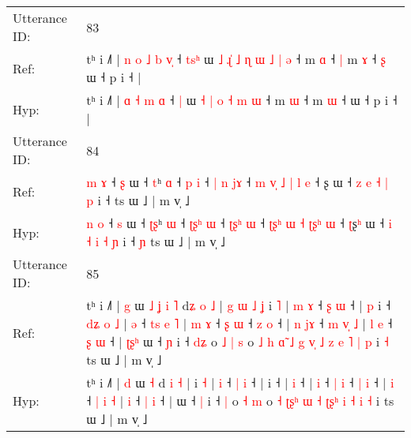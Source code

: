 \documentclass[10pt]{article}
\DeclareRobustCommand{\hl}[1]{{\textcolor{red}{#1}}}
\begin{document}
\begin{longtable}{ll}
 \\
\midrule
Utterance ID: & 83 \\
Ref: & tʰ i ˩˥ |\hl{ }\hl{n} \hl{o} \hl{˩} \hl{b} \hl{v}\hl{̩} ˧ \hl{t}\hl{s}\hl{ʰ} ɯ\hl{ }\hl{˩}\hl{ }\hl{ɻ}\hl{̍} \hl{˩} \hl{ɳ} \hl{ɯ} \hl{˩} \hl{|} \hl{ə} ˧ m \hl{ɑ} ˧\hl{ }\hl{|} m \hl{ɤ} ˧\hl{ }\hl{ʂ} ɯ ˧ p i ˧ |
 \\
Hyp: & tʰ i ˩˥ |\hl{}\hl{} \hl{ɑ} \hl{˧} \hl{m} \hl{}\hl{ɑ} ˧ \hl{}\hl{}\hl{|} ɯ\hl{}\hl{}\hl{}\hl{}\hl{} \hl{˧} \hl{|} \hl{o} \hl{˧} \hl{m} \hl{ɯ} ˧ m \hl{ɯ} ˧\hl{}\hl{} m \hl{ɯ} ˧\hl{}\hl{} ɯ ˧ p i ˧ |
 \\
\midrule
Utterance ID: & 84 \\
Ref: & \hl{m} \hl{ɤ} ˧ \hl{ʂ} ɯ ˧ \hl{}\hl{t}ʰ \hl{ɑ} ˧ \hl{}\hl{}\hl{p} \hl{i} ˧ \hl{|}\hl{ }\hl{n} \hl{j}\hl{ɤ} ˧ \hl{}\hl{m}\hl{ }\hl{v}\hl{̩} \hl{˩} \hl{|}\hl{ }\hl{l} \hl{e} ˧ \hl{}ʂ\hl{} ɯ ˧ \hl{z} \hl{e} \hl{˧} \hl{|} \hl{p} i ˧\hl{}\hl{} ts ɯ ˩ | m v̩ ˩
 \\
Hyp: & \hl{n} \hl{o} ˧ \hl{s} ɯ ˧ \hl{ʈ}\hl{ʂ}ʰ \hl{ɯ} ˧ \hl{ʈ}\hl{ʂ}\hl{ʰ} \hl{ɯ} ˧ \hl{ʈ}\hl{ʂ}\hl{ʰ} \hl{}\hl{ɯ} ˧ \hl{ʈ}\hl{ʂ}\hl{ʰ}\hl{ }\hl{ɯ} \hl{˧} \hl{ʈ}\hl{ʂ}\hl{ʰ} \hl{ɯ} ˧ \hl{ʈ}ʂ\hl{ʰ} ɯ ˧ \hl{i} \hl{˧} \hl{i} \hl{˧} \hl{ɲ} i ˧\hl{ }\hl{ɲ} ts ɯ ˩ | m v̩ ˩
 \\
\midrule
Utterance ID: & 85 \\
Ref: & tʰ i ˩˥ | \hl{g} ɯ\hl{ }\hl{˩}\hl{ }\hl{ʝ}\hl{ }\hl{i} \hl{˥} d\hl{ʑ} \hl{o} \hl{˩} |\hl{ }\hl{g}\hl{ }\hl{ɯ}\hl{ }\hl{˩}\hl{ }\hl{ʝ} i \hl{˥} |\hl{ }\hl{m} \hl{ɤ} ˧ \hl{ʂ} \hl{ɯ} ˧ |\hl{ }\hl{p} i ˧\hl{ }\hl{d}\hl{ʑ}\hl{ }\hl{o}\hl{ }\hl{˩} | \hl{ə} ˧\hl{ }\hl{t}\hl{s}\hl{ }\hl{e}\hl{ }\hl{˥} |\hl{ }\hl{m} \hl{ɤ} ˧ \hl{ʂ} \hl{ɯ} ˧ \hl{z} \hl{o} ˧ |\hl{ }\hl{n} \hl{j}\hl{ɤ} ˧ \hl{m} \hl{v}\hl{̩} \hl{˩} |\hl{ }\hl{l} \hl{e} ˧ \hl{ʂ} \hl{ɯ} ˧ |\hl{ }\hl{ʈ}\hl{ʂ}\hl{ʰ} ɯ ˧ \hl{ɲ} i ˧ \hl{d}\hl{ʑ} o\hl{ }\hl{˩} \hl{|} \hl{s} o\hl{ }\hl{˩} \hl{h} \hl{ɑ}\hl{̃}\hl{ }\hl{˩} \hl{g} \hl{v}\hl{̩} \hl{˩}\hl{ }\hl{z} \hl{e} \hl{˥} \hl{|} \hl{p} i\hl{ }\hl{˧} ts ɯ ˩ | m v̩ ˩
 \\
Hyp: & tʰ i ˩˥ | \hl{d} ɯ\hl{}\hl{}\hl{}\hl{}\hl{}\hl{} \hl{˧} d\hl{} \hl{i} \hl{˧} |\hl{}\hl{}\hl{}\hl{}\hl{}\hl{}\hl{}\hl{} i \hl{˧} |\hl{}\hl{} \hl{i} ˧ \hl{|} \hl{i} ˧ |\hl{}\hl{} i ˧\hl{}\hl{}\hl{}\hl{}\hl{}\hl{}\hl{} | \hl{i} ˧\hl{}\hl{}\hl{}\hl{}\hl{}\hl{}\hl{} |\hl{}\hl{} \hl{i} ˧ \hl{|} \hl{i} ˧ \hl{|} \hl{i} ˧ |\hl{}\hl{} \hl{}\hl{i} ˧ \hl{|} \hl{}\hl{i} \hl{˧} |\hl{}\hl{} \hl{i} ˧ \hl{|} \hl{i} ˧ |\hl{}\hl{}\hl{}\hl{} ɯ ˧ \hl{|} i ˧ \hl{}\hl{|} o\hl{}\hl{} \hl{˧} \hl{m} o\hl{}\hl{} \hl{˧} \hl{}\hl{ʈ}\hl{ʂ}\hl{ʰ} \hl{ɯ} \hl{}\hl{˧} \hl{ʈ}\hl{ʂ}\hl{ʰ} \hl{i} \hl{˧} \hl{i} \hl{˧} i\hl{}\hl{} ts ɯ ˩ | m v̩ ˩

\end{longtable}
\end{document}
